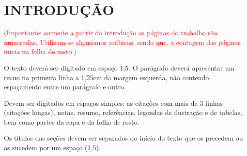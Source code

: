\chapter{INTRODUÇÃO}

\textcolor{red}{(Importante: somente a partir da introdução as páginas do trabalho são numeradas. Utilizam-se
algarismos arábicos, sendo que, a contagem das páginas inicia na folha de rosto.)}

O texto deverá ser digitado em espaço 1,5. O parágrafo deverá apresentar um recuo na primeira linha a 1,25cm da margem
esquerda, não contendo espaçamento entre um parágrafo e outro.

Devem ser digitados em espaços simples: as citações com mais de 3 linhas (citações longas), notas, resumo, referências, legendas de ilustração e de tabelas, bem como partes da capa e da folha de rosto.

Os títulos das seções devem ser separados do início do texto que os precedem ou os sucedem por um espaço (1,5).

\bigskip
